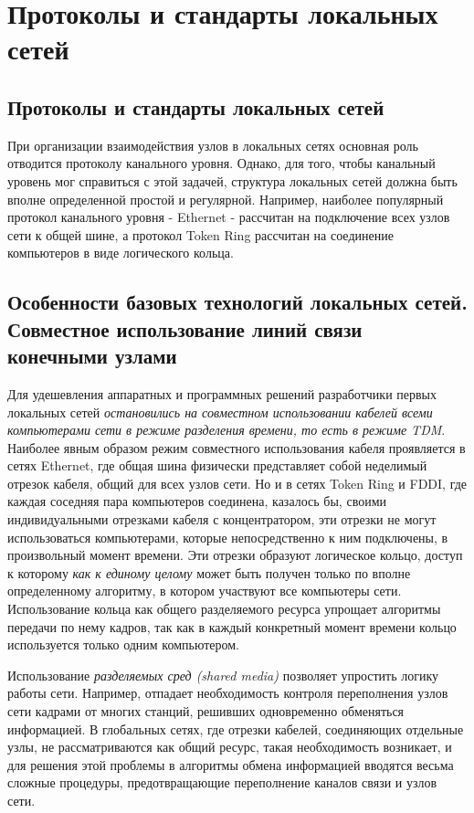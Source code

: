 \chapter{Протоколы и стандарты локальных сетей}

\section{Протоколы и стандарты локальных сетей}

При организации взаимодействия узлов в локальных сетях основная роль отводится протоколу канального уровня.
Однако, для того, чтобы канальный уровень мог справиться с этой задачей, структура локальных сетей должна быть вполне определенной простой и регулярной.
Например, наиболее популярный протокол канального уровня - Ethernet - рассчитан на подключение всех узлов сети к общей шине, а протокол Token Ring рассчитан на соединение компьютеров в виде логического кольца.

\section{Особенности базовых технологий локальных сетей. Совместное использование линий связи конечными узлами}

Для удешевления аппаратных и программных решений разработчики первых локальных сетей \emph{остановились на совместном использовании кабелей всеми компьютерами сети в режиме разделения времени, то есть в режиме TDM}.
Наиболее явным образом режим совместного использования кабеля проявляется в сетях Ethernet, где общая шина физически представляет собой неделимый отрезок кабеля, общий для всех узлов сети.
Но и в сетях Token Ring и FDDI, где каждая соседняя пара компьютеров соединена, казалось бы, своими индивидуальными отрезками кабеля с концентратором, эти отрезки не могут использоваться компьютерами, которые непосредственно к ним подключены, в произвольный момент времени.
Эти отрезки образуют логическое кольцо, доступ к которому \emph{как к единому целому} может быть получен только по вполне определенному алгоритму, в котором участвуют все компьютеры сети.
Использование кольца как общего разделяемого ресурса упрощает алгоритмы передачи по нему кадров, так как в каждый конкретный момент времени кольцо используется только одним компьютером.

Использование \emph{разделяемых сред (shared media)} позволяет упростить логику работы сети.
Например, отпадает необходимость контроля переполнения узлов сети кадрами от многих станций, решивших одновременно обменяться информацией.
В глобальных сетях, где отрезки кабелей, соединяющих отдельные узлы, не рассматриваются как общий ресурс, такая необходимость возникает, и для решения этой проблемы в алгоритмы обмена информацией вводятся весьма сложные процедуры, предотвращающие переполнение каналов связи и узлов сети.

